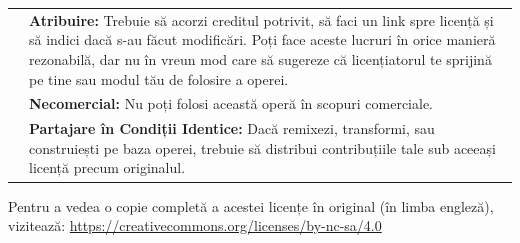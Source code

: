 \begin{raggedright}
\begin{tabularx}{\textwidth}{p{\widthof{\ccAttribution}+2mm}X}
	\ccAttribution & \textbf{Atribuire:} Trebuie să acorzi creditul potrivit, să faci un link
	spre licență și să indici dacă s-au făcut modificări. Poți face aceste lucruri
	în orice manieră rezonabilă, dar nu în vreun mod care să sugereze că
	licențiatorul te sprijină pe tine sau modul tău de folosire a operei.\\
	\ccNonCommercialEU & \textbf{Necomercial:} Nu poți
	folosi această operă în scopuri comerciale.\\
	\ccShareAlike & \textbf{Partajare în Condiții
		Identice:} Dacă remixezi, transformi, sau construiești pe baza operei, trebuie
	să distribui contribuțiile tale sub aceeași licență precum originalul.
\end{tabularx}
\vspace{3mm}

Pentru a vedea o copie completă a acestei licențe în original (în limba engleză), vizitează: \href{https://creativecommons.org/licenses/by-nc-sa/4.0/}{https://creativecommons.org/licenses/by-nc-sa/4.0}

\end{raggedright}
\endgroup

\restoregeometry
